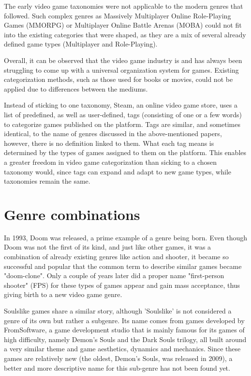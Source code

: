 The early video game taxonomies were not applicable to the modern genres that followed\cite{starosta2024tangled}. Such complex genres as Massively Multiplayer Online Role-Playing Games (MMORPG) or Multiplayer Online Battle Arenas (MOBA) could not fit into the existing categories that were shaped, as they are a mix of several already defined game types (Multiplayer and Role-Playing).

Overall, it can be observed that the video game industry is and has always been struggling to come up with a universal organization system for games. Existing categorization methods, such as those used for books or movies, could not be applied due to differences between the mediums\cite{lee2014facet}.

Instead of sticking to one taxonomy, Steam\cite{steam}, an online video game store, uses a list of predefined, as well as user-defined, tags (consisting of one or a few words) to categorize games published on the platform. Tags are similar, and sometimes identical, to the name of genres discussed in the above-mentioned papers, however, there is no definition linked to them. What each tag means is determined by the types of games assigned to them on the platform. This enables a greater freedom in video game categorization than sicking to a chosen taxonomy would, since tags can expand and adapt to new game types, while taxonomies remain the same.



\section{Genre combinations}

In 1993, Doom\cite{doom1993} was released, a prime example of a genre being born. Even though Doom was not the first of its kind, and just like other games, it was a combination of already existing genres like action and shooter, it became so successful and popular that the common term to describe similar games became "doom-clone". Only a couple of years later did a proper name "first-person shooter" (FPS) for these types of games appear and gain mass acceptance\cite{arsenault2009}, thus giving birth to a new video game genre.

Soulslike games share a similar story, although 'Soulslike' is not considered a genre of its own but rather a subgenre. Its name comes from games developed by FromSoftware, a game development studio that is mainly famous for its games of high difficulty, namely Demon's Souls and the Dark Souls trilogy, all built around a very similar theme and game aesthetics, dynamics and mechanics\cite{hunicke2004mda}. Since these games are relatively new (the oldest, Demon's Souls, was released in 2009), a better and more descriptive name for this sub-genre has not been found yet.



